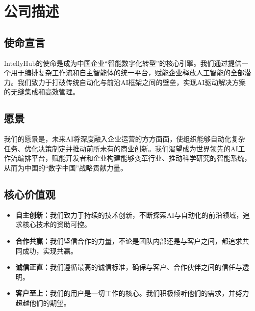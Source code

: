 \documentclass[11点, A4纸, 单面]{article}
\begin{document}
\section{公司描述}
\subsection{使命宣言}
IntellyHub的使命是成为中国企业“智能数字化转型”的核心引擎。我们通过提供一个用于编排复杂工作流和自主智能体的统一平台，赋能企业释放人工智能的全部潜力。我们致力于打破传统自动化与前沿AI框架之间的壁垒，实现AI驱动解决方案的无缝集成和高效管理。


\subsection{愿景}
我们的愿景是，未来AI将深度融入企业运营的方方面面，使组织能够自动化复杂任务、优化决策制定并推动前所未有的商业创新。我们渴望成为世界领先的AI工作流编排平台，赋能开发者和企业构建能够变革行业、推动科学研究的智能系统，从而为中国的“数字中国”战略贡献力量。

\subsection{核心价值观}
\begin{itemize}
    \item \textbf{自主创新：}我们致力于持续的技术创新，不断探索AI与自动化的前沿领域，追求核心技术的资助可控。  
    \item \textbf{合作共赢：}我们坚信合作的力量，不论是团队内部还是与客户之间，都追求共同成功，实现共赢。
    \item \textbf{诚信正直：}我们遵循最高的诚信标准，确保与客户、合作伙伴之间的信任与透明。
    \item \textbf{客户至上：}我们的用户是一切工作的核心。我们积极倾听他们的需求，并努力超越他们的期望。
\end{itemize}
\end{document}
